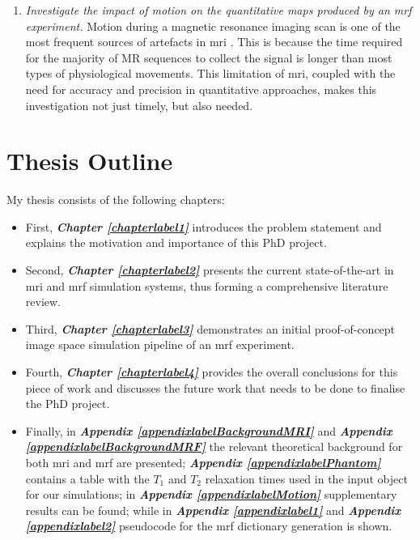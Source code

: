 \begin{enumerate}
	\item \textit{Investigate the impact of motion on the quantitative maps produced by an \ac{mrf} experiment.}
	Motion during a magnetic resonance imaging scan is one of the most frequent sources of artefacts in \ac{mri} \cite{Zaitsev2015}. 
	This is because the time required for the majority of MR sequences to collect the signal is longer than most types of physiological movements.
	This limitation of \ac{mri}, coupled with the need for accuracy and precision in quantitative approaches, makes this investigation not just timely, but also needed.

\end{enumerate}

\section{Thesis Outline}\label{chapterlabel1sec5}

My thesis consists of the following chapters:
\begin{itemize} 
	\item First, \textbf{\textit{Chapter \ref{chapterlabel1}}} introduces the problem statement and explains the motivation and importance of this PhD project.

	\item Second, \textbf{\textit{Chapter \ref{chapterlabel2}}} presents the current state-of-the-art in \ac{mri} and \ac{mrf} simulation systems, thus forming a comprehensive literature review.

	\item Third, \textbf{\textit{Chapter \ref{chapterlabel3}}} demonstrates an initial proof-of-concept image space simulation pipeline of an \ac{mrf} experiment.
	
	\item Fourth, \textbf{\textit{Chapter \ref{chapterlabel4}}} provides the overall conclusions for this piece of work and discusses the future work that needs to be done to finalise the PhD project.

	\item Finally, in \textbf{\textit{Appendix \ref{appendixlabelBackgroundMRI}}} and \textbf{\textit{Appendix \ref{appendixlabelBackgroundMRF}}} the relevant theoretical background for both \ac{mri} and \ac{mrf} are presented;
	\textbf{\textit{Appendix \ref{appendixlabelPhantom}}} contains a table with the $T_1$ and $T_2$ relaxation times used in the input object for our simulations;
	in \textbf{\textit{Appendix \ref{appendixlabelMotion}}} supplementary results can be found;
	while in \textbf{\textit{Appendix \ref{appendixlabel1}}} and \textbf{\textit{Appendix \ref{appendixlabel2}}} pseudocode for the \ac{mrf} dictionary generation is shown.

\end{itemize}









